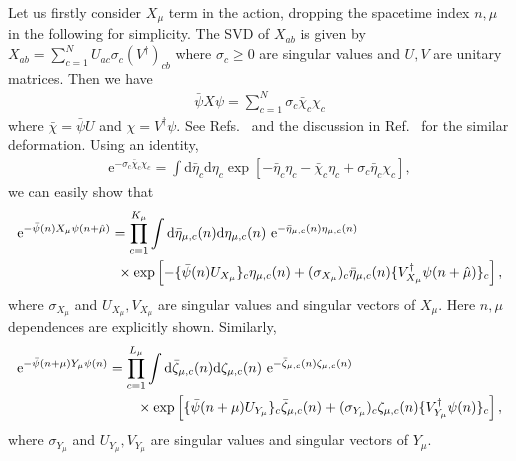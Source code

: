 \documentclass[a4paper,11pt]{article}
\newcommand{\diff}{\mathrm{d}}
\newcommand{\e}{\mathrm{e}}
\begin{document}
 
Let us firstly consider $X_\mu$ term in the action, dropping the spacetime index $n, \mu$ in the following for simplicity. The SVD of $X_{ab}$ is given by $X_{ab}=\sum_{c=1}^N U_{ac} \sigma_c (V^\dag)_{cb}$ where $\sigma_c \ge0$ are singular values and $U,V$ are unitary matrices. Then we have
\begin{align}
\label{eq:step1}
	\bar{\psi} X \psi= \sum_{c=1}^N \sigma_{c}\bar{\chi}_c \chi_c
\end{align}
where $\bar\chi = \bar\psi U$ and  $\chi = V^\dag\psi$. See Refs.~\cite{Shimizu:2014uva,Shimizu:2014fsa,Shimizu:2017onf,Takeda:2014vwa,Kadoh:2018hqq} 
and the discussion in Ref.~\cite{Meurice:2012wp} for the similar deformation. 
%
Using an identity,  
\begin{align}
\label{eq:identity}
	\e^{- \sigma_{c} \bar{\chi}_c  \chi_c}
	=\int\diff\bar{\eta}_c \diff\eta_c
	\exp\left[-\bar{\eta}_c\eta_c -\bar{\chi}_c {\eta}_c +  \sigma_{c}  \bar\eta_c \chi_c \right],
\end{align}
we can easily show that
\begin{align}
\label{eq:basic_id1}
	&\e^{-\bar{\psi}(n) X_\mu \psi(n+\hat\mu) } %
	=  \prod_{c=1}^{K_\mu}  
	\int\diff\bar{\eta}_{\mu,c}(n) \diff\eta_{\mu,c}(n)~{\rm e}^{-\bar{\eta}_{\mu,c}(n) \eta_{\mu,c}(n)}\nonumber\\
	& \hspace{2.5cm} \times\exp\left[ -\{\bar{\psi}(n)U_{X_\mu}\}_{c}  \eta_{\mu,c}(n) +(\sigma_{X_\mu})_{c}  \bar{\eta}_{\mu,c}(n) \{V^{\dag}_{X_\mu}\psi(n+\hat\mu)\}_{c} \right],
\end{align}
where $\sigma_{X_\mu}$  and $U_{X_\mu}, V_{X_\mu}$ are singular values and singular vectors of $X_\mu$. Here $n,\mu$ dependences are explicitly shown. Similarly, 
\begin{align}
\label{eq:basic_id2}
	&\e^{-\bar{\psi}(n+\mu) Y_\mu \psi(n) } %
	=  \prod_{c=1}^{L_\mu}  
	\int\diff\bar{\zeta}_{\mu,c}(n) \diff\zeta_{\mu,c}(n)~{\rm e}^{-\bar{\zeta}_{\mu,c}(n) \zeta_{\mu,c}(n)}\nonumber\\
	&\hspace{3cm} \times\exp\left[\{\bar{\psi}(n+\mu)U_{Y_\mu}\}_{c}  \bar{\zeta}_{\mu,c}(n) + (\sigma_{Y_\mu})_{c}  \zeta_{\mu,c}(n)\{V^{\dag}_{Y_\mu}\psi(n)\}_{c} \right],
\end{align}
where $\sigma_{Y_\mu}$  and $U_{Y_\mu}, V_{Y_\mu}$  are singular values and singular vectors of $Y_\mu$. 
\end{document}
